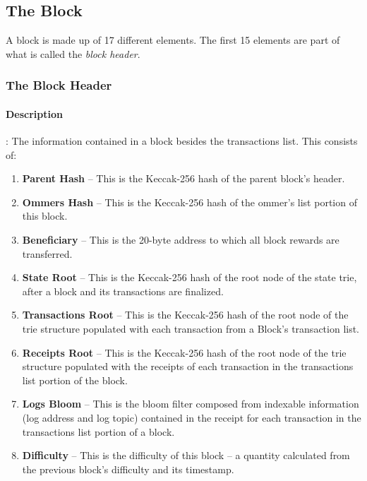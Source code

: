 \documentclass[10pt,letterpaper,leqno,bibliography=totoc]{scrartcl}
\newenvironment{alphafootnotes}
{\par\edef\savedfootnotenumber{\number\value{footnote}}
\renewcommand{\thefootnote}{\alph{footnote}}
\setcounter{footnote}{0}}
{\par\setcounter{footnote}{\savedfootnotenumber}}
\begin{document}
\begin{alphafootnotes}
\begin{multicols*}{2}
				

			\subsection{The Block}
				A block is made up of 17 different elements. The first 15 elements are part of what is called the \textsl{block header}.


			\subsubsection{The Block Header}
				\paragraph{Description}: The information contained in a block besides the transactions list. This consists of:

				\begin{enumerate}
					\item \textbf{Parent Hash} -- This is the Keccak-256 hash of the parent block's header.
					\item \textbf{Ommers Hash} -- This is the Keccak-256 hash of the ommer's list portion of this block.
					\item \textbf{Beneficiary} -- This is the 20-byte address to which all block rewards are transferred.
					\item \textbf{State Root} -- This is the Keccak-256 hash of the root node of the state trie, after a block and its transactions are finalized.
					
					\item \textbf{Transactions Root} -- This is the Keccak-256 hash of the root node of the trie structure populated with each transaction from a Block's transaction list.
					\item \textbf{Receipts Root} -- This is the Keccak-256 hash of the root node of the trie structure populated with the receipts of each transaction in the transactions list portion of the block.
					\item \textbf{Logs Bloom} -- This is the bloom filter composed from indexable information (log address and log topic) contained in the receipt for each transaction in the transactions list portion of a block.
					\item \textbf{Difficulty} -- This is the difficulty of this block -- a quantity calculated from the previous block's difficulty and its timestamp.


\end{enumerate}
\end{multicols*}
\end{alphafootnotes}
\end{document}
